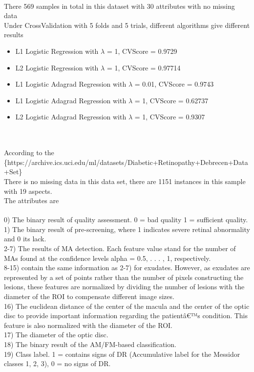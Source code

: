 \documentclass{article}
\begin{document}
		\\There 569 samples in total in this dataset with 30 attributes with no missing data\\

		Under CrossValidation with 5 folds and 5 trials, different algorithms give different results
		\begin{itemize}
		\item L1 Logistic Regression with $\lambda$ = 1, CVScore = 0.9729
		\item L2 Logistic Regression with $\lambda$ = 1, CVScore = 0.97714
		\item L1 Logistic Adagrad Regression with $\lambda$ = 0.01, CVScore = 0.9743
		\item L1 Logistic Adagrad Regression with $\lambda$ = 1, CVScore = 0.62737
		\item L2 Logistic Adagrad Regression with $\lambda$ = 1, CVScore = 0.9307
		\end{itemize}\\

\\According to the \{https://archive.ics.uci.edu/ml/datasets/Diabetic+Retinopathy+Debrecen+Data+Set\}
\\There is no missing data in this data set, there are 1151 instances in this sample with 19 aspects.\\
The attributes are \\\\
0) The binary result of quality assessment. 0 = bad quality 1 = sufficient quality.\\ 
1) The binary result of pre-screening, where 1 indicates severe retinal abnormality and 0 its lack. \\
2-7) The results of MA detection. Each feature value stand for the 
number of MAs found at the confidence levels alpha = 0.5, . . . , 1, respectively. \\
8-15) contain the same information as 2-7) for exudates. However, 
as exudates are represented by a set of points rather than the number of 
pixels constructing the lesions, these features are normalized by dividing the 
number of lesions with the diameter of the ROI to compensate different image 
sizes.\\
16) The euclidean distance of the center of 
the macula and the center of the optic disc to provide important information 
regarding the patientâ€™s condition. This feature 
is also normalized with the diameter of the ROI. \\
17) The diameter of the optic disc. \\
18) The binary result of the AM/FM-based classification. \\
19) Class label. 1 = contains signs of DR (Accumulative label for the Messidor classes 1, 2, 3), 0 = no signs of DR.\\
\end{document}
